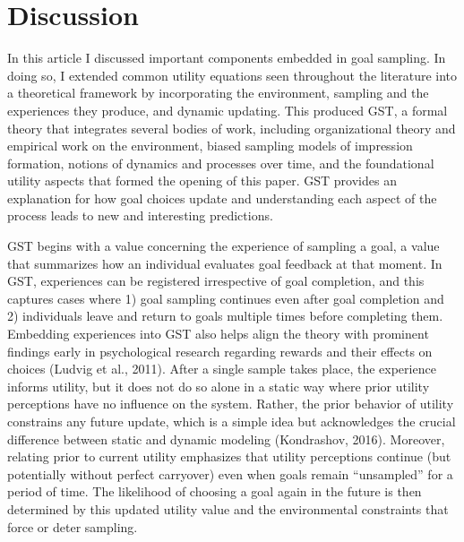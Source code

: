 \documentclass[english,,man]{apa6}
\theoremstyle{definition}
\theoremstyle{definition}
\theoremstyle{definition}
\theoremstyle{remark}
\begin{document}
\hypertarget{discussion}{%
\section{Discussion}\label{discussion}}

In this article I discussed important components embedded in goal
sampling. In doing so, I extended common utility equations seen
throughout the literature into a theoretical framework by incorporating
the environment, sampling and the experiences they produce, and dynamic
updating. This produced GST, a formal theory that integrates several
bodies of work, including organizational theory and empirical work on
the environment, biased sampling models of impression formation, notions
of dynamics and processes over time, and the foundational utility
aspects that formed the opening of this paper. GST provides an
explanation for how goal choices update and understanding each aspect of
the process leads to new and interesting predictions.

GST begins with a value concerning the experience of sampling a goal, a
value that summarizes how an individual evaluates goal feedback at that
moment. In GST, experiences can be registered irrespective of goal
completion, and this captures cases where 1) goal sampling continues
even after goal completion and 2) individuals leave and return to goals
multiple times before completing them. Embedding experiences into GST
also helps align the theory with prominent findings early in
psychological research regarding rewards and their effects on choices
(Ludvig et al., 2011). After a single sample takes place, the experience
informs utility, but it does not do so alone in a static way where prior
utility perceptions have no influence on the system. Rather, the prior
behavior of utility constrains any future update, which is a simple idea
but acknowledges the crucial difference between static and dynamic
modeling (Kondrashov, 2016). Moreover, relating prior to current utility
emphasizes that utility perceptions continue (but potentially without
perfect carryover) even when goals remain \enquote{unsampled} for a
period of time. The likelihood of choosing a goal again in the future is
then determined by this updated utility value and the environmental
constraints that force or deter sampling.
\end{document}

